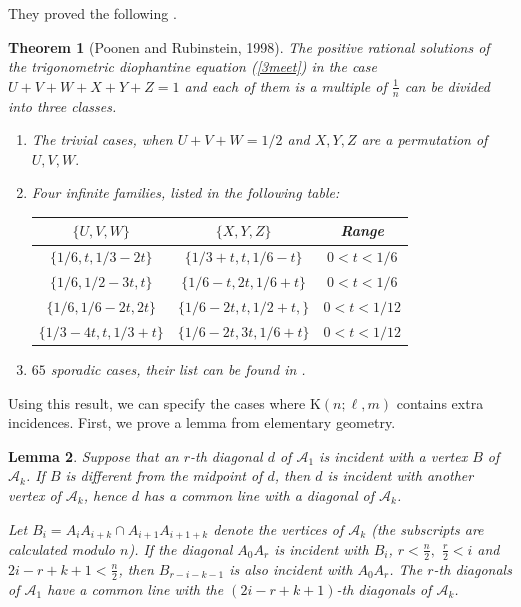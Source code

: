 \documentclass[12pt]{article}
\newtheorem{thm}                   {Theorem} %
\newtheorem{lem}          [thm]{Lemma}
\theoremstyle{definition} \newtheorem*{definition}              {Definition}
\theoremstyle{definition} \newtheorem {remark}                   {Remark}
\theoremstyle{definition} \newtheorem*{problem}                {Problem}
\theoremstyle{definition} \newtheorem{example}     [thm]{Example}
\begin{document}
They proved the following  \cite[Theorem 4]{PR}.
\smallskip
\begin{thm}[Poonen and Rubinstein, 1998] 
\label{pr-list}
The positive rational solutions of the trigonometric diophantine equation {\rm(\ref{3meet})}
in the case $U+V+W+X+Y+Z=1$ and each of them is a multiple of $\frac{1}{n}$ 
can be divided into three classes.
\begin{enumerate}
\item[$(i)$]
The trivial cases, when $U+V+W=1/2$ and $X,Y,Z$ are a permutation of 
$U,V,W.$
\item[$(ii)$]
Four infinite families, listed in the following table:

\begin{tabular}{||c|c||c||}
\hline
 $\{ U,V,W\} $ &  $\{X,Y,Z\} $ & Range \\
\hline
\hline
$\{ 1/6, t,1/3-2t\} $ & $\{ 1/3+t, t, 1/6-t \} $ & $0<t<1/6$ \\
\hline
$\{  1/6, 1/2-3t, t  \} $  & $\{  1/6-t , 2t, 1/6+t  \} $  & $0<t<1/6 $\\
\hline
$\{ 1/6, 1/6-2t, 2t   \} $ & $\{ 1/6-2t , t , 1/2+t,   \} $ & $0<t<1/12$ \\
\hline 
$\{ 1/3-4t, t, 1/3+t  \} $ & $\{ 1/6-2t, 3t,1/6+t  \} $& $0<t<1/12$ \\
\hline
\end{tabular}


\item[$(iii)$]
$65$ sporadic cases, their list can be found in {\rm \cite[Table 4]{PR}}.
\end{enumerate}
\end{thm}

Using this result, we can specify the cases where 
$\mathrm{K}(n;\ell,m)$ contains extra incidences. 
First, we prove a lemma from elementary geometry.

\begin{lem}
\label{3-bol4}
Suppose that an $r$-th diagonal $d$ of $\mathcal{A}_1 $ is incident with a vertex $B$ of $\mathcal{A}_k$. 
If $B$ is different from the midpoint of $d$, then $d$ is incident with another vertex of $\mathcal{A}_k $, 
hence $d$ has a common line with a diagonal of $\mathcal{A}_k $.

Let $B_i=A_iA_{i+k}\cap A_{i+1}A_{i+1+k}$ denote the vertices of
$\mathcal{A}_k $ (the subscripts are calculated modulo $n$). 
If the diagonal $A_0A_{r}$ is incident with $B_i$, $r<\frac{n}{2},$ $\frac{r}{2}<i$ and 
$2i-r+k+1<\frac{n}{2}$, then $B_{r-i-k-1}$ is also incident with $A_0A_{r}$. 
The $r$-th diagonals of $\mathcal{A}_1 $
have a common line with the $(2i-r+k+1)$-th diagonals of $\mathcal{A}_k $. 
\end{lem}
\end{document}
